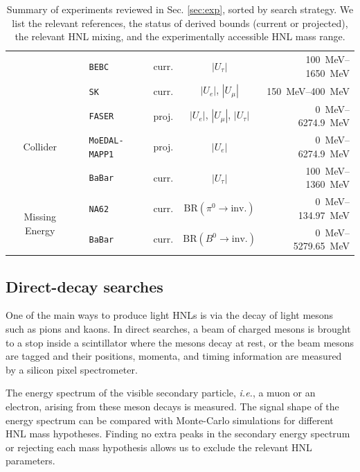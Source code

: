 \begin{table}[h!t]
\begin{tabular}{|c|lll|cr|}
& \cite{Barouki:2022bkt} & \texttt{BEBC} & curr. &  $ |U_\tau|$ & \SIrange{100}{1650}{\MeV}\\
& \cite{Coloma:2019htx} & \texttt{SK} & curr. &  $|U_e|$, $|U_\mu|$ & \SIrange{150}{400}{\MeV} \\
\hline
\multirow{3}{*}{Collider} & \cite{Kling:2018wct} & \texttt{FASER} & proj. & $|U_e|$, $|U_\mu|$, $|U_\tau|$ & \SIrange{0}{6274.9}{\MeV} \\
& \cite{DeVries:2020jbs} & \texttt{MoEDAL-MAPP1} & proj. &  $|U_e|$ & \SIrange{0}{6274.9}{\MeV}\\
& \cite{BaBar:2022cqj} & \texttt{BaBar} & curr. &  $|U_\tau|$ & \SIrange{100}{1360}{\MeV}\\
\hline
\multirow{2}{*}{Missing Energy} & \cite{NA62:2020pwi} & \texttt{NA62} & curr. &   $\text{BR}(\pi^0 \to \text{inv.})$ & \SIrange{0}{134.97}{MeV}\\
& \cite{BaBar:2012yut} & \texttt{BaBar} & curr. &$\text{BR}(B^0 \to \text{inv.})$ & \SIrange{0}{5279.65}{MeV}\\
\hline
\end{tabular}
\caption{Summary of experiments reviewed in Sec. \ref{sec:exp}, sorted by search strategy. We list the relevant references, the status of derived bounds (current or projected), the relevant HNL mixing, and the experimentally accessible HNL mass range.}
\label{tab:exp_summary}
\end{table}




\subsection{Direct-decay searches}

One of the main ways to produce light HNLs is via the decay of light mesons such as pions and kaons.
In direct searches, a beam of charged mesons is brought to a stop inside a scintillator where the mesons decay at rest, or 
the beam mesons are tagged and their positions, momenta, and timing information are measured by a silicon pixel spectrometer.


The energy spectrum of the visible secondary particle, \textit{i.e.}, a muon or an electron, arising from these meson 
decays is measured.  The signal shape of the energy spectrum can be compared with Monte-Carlo simulations for different 
HNL mass hypotheses. Finding no extra peaks in the secondary energy spectrum or rejecting each mass hypothesis allows us to 
exclude the relevant HNL parameters. 


